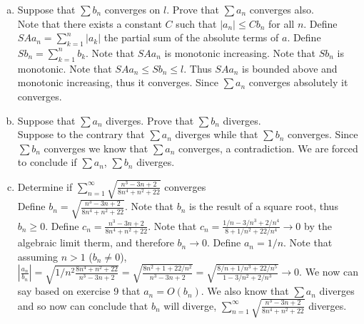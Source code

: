 \documentclass[12pt]{article}
\theoremstyle{homework}
\begin{document}
\begin{enumerate}[a)]
\item
Suppose that $\sum b_n$ converges on $l$. Prove that $\sum a_n$ converges also.\\
Note that there exists a constant $C$ such that $|a_n| \leq Cb_n$ for all $n$.  Define $SAa_n=\sum_{k=1}^n |a_k|$ the partial sum of the absolute terms of $a$.  Define $Sb_n=\sum_{k=1}^n b_k$.  Note that $SAa_n$ is monotonic increasing.  Note that $Sb_n$ is monotonic.  Note that $SAa_n\leq Sb_n\leq l$.  Thus $SAa_n$ is bounded above and monotonic increasing, thus it converges.  Since $\sum a_n$ converges absolutely it converges.
\item
Suppose that $\sum a_n$ diverges. Prove that $\sum b_n$ diverges.\\
Suppose to the contrary that $\sum a_n$ diverges while that $\sum b_n$ converges.  Since $\sum b_n$ converges we know that $\sum a_n$ converges, a contradiction.  We are forced to conclude if $\sum a_n$, $\sum b_n$ diverges.
\item
Determine if $\sum_{n=1}^\infty \sqrt{\frac{n^3-3n+2}{8n^4+n^2+22}}$ converges\\
Define $b_n=\sqrt{\frac{n^3-3n+2}{8n^4+n^2+22}}$.  Note that $b_n$ is the result of a square root, thus $b_n\geq 0$.  Define $c_n=\frac{n^3-3n+2}{8n^4+n^2+22}$.  Note that $c_n=\frac{1/n-3/n^3+2/n^4}{8+1/n^2+22/n^4}\rightarrow 0$ by the algebraic limit therm, and therefore $b_n\rightarrow 0$.  Define $a_n=1/n$.  Note that assuming $n>1$ ($b_n\neq 0$), $|\frac{a_n}{b_n}|=\sqrt{1/n^2\frac{8n^4+n^2+22}{n^3-3n+2}}=\sqrt{\frac{8n^2+1+22/n^2}{n^3-3n+2}}=\sqrt{\frac{8/n+1/n^3+22/n^5}{1-3/n^2+2/n^3}}\rightarrow 0$.  We now can say based on exercise 9 that $a_n=O(b_n)$.  We also know that $\sum a_n$ diverges and so now can conclude that $b_n$ will diverge, $\sum_{n=1}^\infty \sqrt{\frac{n^3-3n+2}{8n^4+n^2+22}}$ diverges.
\end{enumerate}
\end{document}
